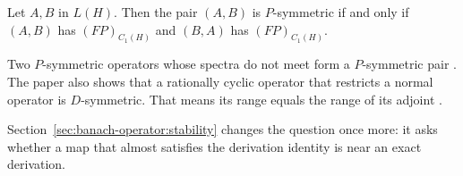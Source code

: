 \begin{theorem}\label{thm:banach:p-symmetric-pair}
Let $A,B$ in $L(H)$. Then the pair $(A,B)$ is $P$-symmetric if and only if
$(A,B)$ has $(FP)_{C_1(H)}$ and $(B,A)$ has $(FP)_{C_1(H)}$.
\end{theorem}

Two $P$-symmetric operators whose spectra do not meet form a $P$-symmetric
pair \cite[Theorem~3.7, p.~151]{BouhafsiEchChadZouaki2022}. The paper also
shows that a rationally cyclic operator that restricts a normal operator is
$D$-symmetric. That means its range equals the range of its adjoint
\cite[Theorem~3.12, p.~152]{BouhafsiEchChadZouaki2022}.

Section~\ref{sec:banach-operator:stability}
changes the question once more: it asks whether a map that almost
satisfies the derivation identity is near an exact derivation.
